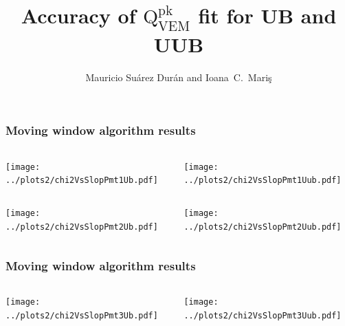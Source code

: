 \documentclass[aspectratio=169]{beamer}
\title{Accuracy of $\mathrm{Q}^{\mathrm{pk}}_{\mathrm{VEM}}$ fit for UB and UUB}
\author{
  Mauricio Su\'arez Dur\'an and Ioana~C.~Mari\c{s}
}
\institute{IIHE-ULB}
\begin{document}
\begin{frame}
  \titlepage
\end{frame}

\begin{frame}
  \frametitle{Moving window algorithm results}
  \vspace{0.5cm}
  \begin{columns}
    \begin{column}{0.5\textwidth}
      \texttt{[image: ../plots2/chi2VsSlopPmt1Ub.pdf]}
    \end{column}
    \begin{column}{0.5\textwidth}
      \texttt{[image: ../plots2/chi2VsSlopPmt1Uub.pdf]}
    \end{column}
  \end{columns}
  \begin{columns}
    \begin{column}{0.5\textwidth}
      \texttt{[image: ../plots2/chi2VsSlopPmt2Ub.pdf]}
    \end{column}
    \begin{column}{0.5\textwidth}
      \texttt{[image: ../plots2/chi2VsSlopPmt2Uub.pdf]}
    \end{column}
  \end{columns}
\end{frame}

\begin{frame}
  \frametitle{Moving window algorithm results}
  \vspace{0.5cm}
  \begin{columns}
    \begin{column}{0.5\textwidth}
      \texttt{[image: ../plots2/chi2VsSlopPmt3Ub.pdf]}
    \end{column}
    \begin{column}{0.5\textwidth}
      \texttt{[image: ../plots2/chi2VsSlopPmt3Uub.pdf]}
    \end{column}
  \end{columns}
\end{frame}
\end{document}
